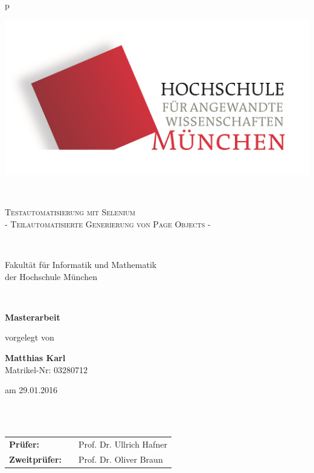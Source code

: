 \begin{center}
\begin{tabular}{p{\textwidth}}


\begin{center}
\includegraphics[scale=0.17]{img/logos.jpg}
\end{center}


\\

\begin{center}
\LARGE{\textsc{
Testautomatisierung mit Selenium \\  \large{- Teilautomatisierte Generierung von Page Objects -}
}}
\end{center}

\\


\begin{center}
\large{Fakultät für Informatik und Mathematik \\
der Hochschule München \\}
\end{center}

\\

\begin{center}
\textbf{\Large{Masterarbeit}}
\end{center}



\begin{center}
vorgelegt von
\end{center}

\begin{center}
\large{\textbf{Matthias Karl}} \\
\large{Matrikel-Nr: 03280712} \\
\end{center}

\begin{center}
\large{am 29.01.2016}
\end{center}

\\

\\

\begin{center}
\begin{tabular}{lll}
\textbf{Prüfer:} & & Prof. Dr. Ullrich Hafner\\
\textbf{Zweitprüfer:} & &  Prof. Dr. Oliver Braun\\
\end{tabular}
\end{center}

\end{tabular}
\end{center}